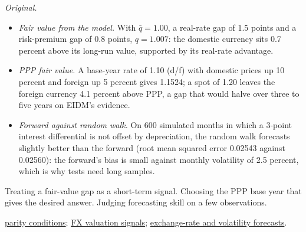 \begin{qfmethod}
 \emph{Original.}
\begin{itemize}
\item \emph{Fair value from the model.} With $\bar q=1.00$, a real-rate gap of 1.5 points and a risk-premium gap of 0.8 points, $q=1.007$: the domestic currency sits 0.7 percent above its long-run value, supported by its real-rate advantage.
\item \emph{PPP fair value.} A base-year rate of 1.10 (d/f) with domestic prices up 10 percent and foreign up 5 percent gives 1.1524; a spot of 1.20 leaves the foreign currency 4.1 percent above PPP, a gap that would halve over three to five years on EIDM's evidence.
\item \emph{Forward against random walk.} On 600 simulated months in which a 3-point interest differential is not offset by depreciation, the random walk forecasts slightly better than the forward (root mean squared error 0.02543 against 0.02560): the forward's bias is small against monthly volatility of 2.5 percent, which is why tests need long samples.
\end{itemize}

 Treating a fair-value gap as a short-term signal. Choosing the PPP base year that gives the desired answer. Judging forecasting skill on a few observations.

 \hyperref[res:international-parity-conditions]{parity conditions}; \hyperref[meth:fx-valuation-signals]{FX valuation signals}; \hyperref[meth:fx-volatility-forecasts]{exchange-rate and volatility forecasts}.

\end{qfmethod}

